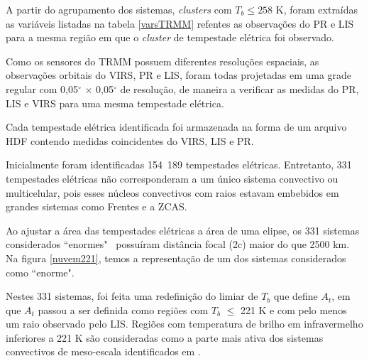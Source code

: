 

A partir do agrupamento dos sistemas, \textit{clusters} com $T_b \leq 258$ K, foram extraídas as variáveis listadas na tabela \ref{varsTRMM} refentes as observações do PR e LIS para a mesma região em que o \textit{cluster} de tempestade elétrica foi observado.

Como os sensores do TRMM possuem diferentes resoluções espaciais, as observações orbitais do VIRS, PR e LIS, foram todas projetadas em uma grade regular com 0,05$^{\circ}$ $\times$ 0,05$^{\circ}$ de resolução, de maneira a verificar as medidas do PR, LIS e VIRS para uma mesma tempestade elétrica.

Cada tempestade elétrica identificada foi armazenada na forma de um arquivo HDF contendo medidas coincidentes do VIRS, LIS e PR. 

Inicialmente foram identificadas 154~189 tempestades elétricas. Entretanto, 331 tempestades elétricas não corresponderam a um único sistema convectivo ou multicelular, pois esses núcleos convectivos com raios estavam embebidos em grandes sistemas como Frentes e a ZCAS. 

Ao ajustar a área das tempestades elétricas a área de uma elipse, os 331 sistemas considerados ``enormes" ~possuíram distância focal (2c) maior do que 2500 km. Na figura \ref{nuvem221}, temos a representação de um dos sistemas considerados como ``enorme". 

Nestes 331 sistemas, foi feita uma redefinição do limiar de $T_b$ que define $A_t$, em que $A_t$ passou a ser definida como regiões com $T_b$ $\leq$ 221 K e com pelo menos um raio observado pelo LIS. Regiões com temperatura de brilho em infravermelho inferiores a 221 K são consideradas como a parte mais ativa dos sistemas convectivos de meso-escala identificados em .  


